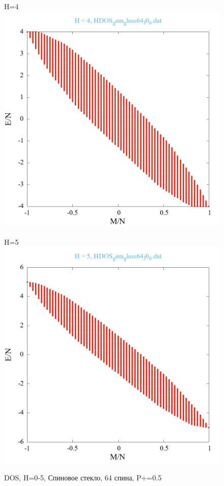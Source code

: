 \documentclass[utf8, babel, sor, jor, amsmath, amssymb, reprint]{elsarticle} %
\begin{document}
\begin{figure}[H]
\begin{minipage}[h]{0.45\linewidth}
	\end{minipage}
	\vfill
	\begin{minipage}[h]{0.45\linewidth}
		\centering H=4
		\includegraphics[width=1\linewidth]{pictures/HDOS_gem_glass64_J0_6.dat_H4.png}
	\end{minipage}
	\hfill
	\begin{minipage}[h]{0.45\linewidth}
		\centering H=5
		\includegraphics[width=1\linewidth]{pictures/HDOS_gem_glass64_J0_6.dat_H5.png}
	\end{minipage}
	\caption{DOS, H=0-5, Спиновое стекло, 64 спина, P+=0.5}
	\label{fig:HDOS_glass}
\end{figure}
\end{document}
